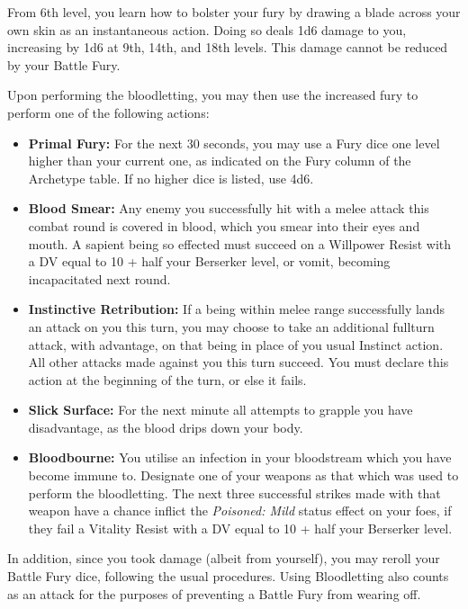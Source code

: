 {
	From 6th level, you learn how to bolster your fury by drawing a blade across your own skin as an instantaneous action. Doing so deals 1d6 damage to you, increasing by 1d6 at 9th, 14th, and 18th levels. This damage cannot be reduced by your Battle Fury. 
	
	Upon performing the bloodletting, you may then use the increased fury to perform one of the following actions:
	
	\newcommand\blood[2]{\item {\bf #1:} #2 }
	
	\begin{itemize}
		\blood{Primal Fury}{For the next 30 seconds, you may use a Fury dice one level higher than your current one, as indicated on the Fury column of the Archetype table. If no higher dice is listed, use 4d6.}
		\blood{Blood Smear}{Any enemy you successfully hit with a melee attack this combat round is covered in blood, which you smear into their eyes and mouth. A sapient being so effected must succeed on a Willpower Resist with a DV equal to 10 + half your Berserker level, or vomit, becoming incapacitated next round.}
		\blood{Instinctive Retribution}{If a being within melee range successfully lands an attack on you this turn, you may choose to take an additional full\minus{}turn attack, with advantage, on that being in place of you usual Instinct action. All other attacks made against you this turn succeed. You must declare this action at the beginning of the turn, or else it fails.}
		\blood{Slick Surface}{For the next minute all attempts to grapple you have disadvantage, as the blood drips down your body.}
		\blood{Bloodbourne}{You utilise an infection in your bloodstream which you have become immune to. Designate one of your weapons as that which was used to perform the bloodletting. The next three successful strikes made with that weapon have a chance inflict the {\it Poisoned: Mild} status effect on your foes, if they fail a Vitality Resist with a DV equal to 10 + half your Berserker level.}
	\end{itemize}
	
	In addition, since you took damage (albeit from yourself), you may re\minus{}roll your Battle Fury dice, following the usual procedures. Using Bloodletting also counts as an attack for the purposes of preventing a Battle Fury from wearing off.  
	
}


